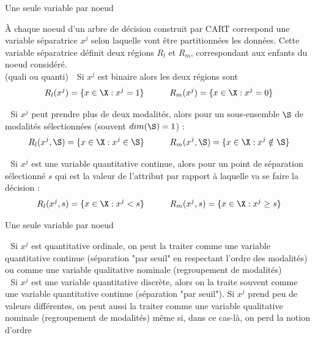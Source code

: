 \documentclass[10pt]{beamer}
\newcommand{\hsp}{\hspace*{1em}}
\begin{document}

\begin{frame}{Une seule variable par noeud}
	
À chaque noeud d’un arbre de décision construit par CART correspond une variable séparatrice $x^j$ selon laquelle vont être partitionnées les données. Cette variable séparatrice définit deux régions $R_{l}$ et $R_{m}$, correspondant aux enfants du noeud considéré.\\[1em]

 (quali ou quanti) \,\, Si $x^j$ est binaire alors les deux régions sont
$$ R_l(x^j) = \{ x\in\X : x^j = 1\} \hsp \hsp \hsp  R_m(x^j) = \{ x\in\X : x^j = 0\} $$

  \,\,  Si $x^j$ peut prendre plus de deux modalités, alors pour un sous-ensemble $\S$ de modalités sélectionnées (souvent $dim(\S)=1$) :
$$ R_l(x^j,\S) = \{ x\in\X : x^j \in \S\} \hsp \hsp \hsp  R_m(x^j,\S) = \{ x\in\X : x^j \notin \S\} $$

  \,\,  Si $x^j$ est une variable quantitative continue, alors pour un point de séparation sélectionné $s$ qui est la valeur de l’attribut par rapport à laquelle va se faire la décision :
$$ R_l(x^j, s) = \{ x\in\X : x^j <s\} \hsp \hsp \hsp  R_m(x^j, s) = \{ x\in\X : x^j \geq s \} $$
	
	
\end{frame}




\begin{frame}{Une seule variable par noeud}
	
	
	  \,\, 
 Si $x^j$ est quantitative ordinale, on peut la traiter comme une variable quantitative continue (séparation "par seuil" en respectant l'ordre des modalités) ou comme une variable qualitative nominale (regroupement de modalités) \\[2em]
	
	  \,\,  Si $x^j$ est une variable quantitative discrète, alors on la traite souvent comme une variable quantitative continue (séparation "par seuil"). Si $x^j$ prend peu de valeurs différentes, on peut aussi la traiter comme une variable qualitative nominale (regroupement de modalités) même si, dans ce cas-là, on perd la notion d'ordre\\[5em]
	
	
\end{frame}
\end{document}
